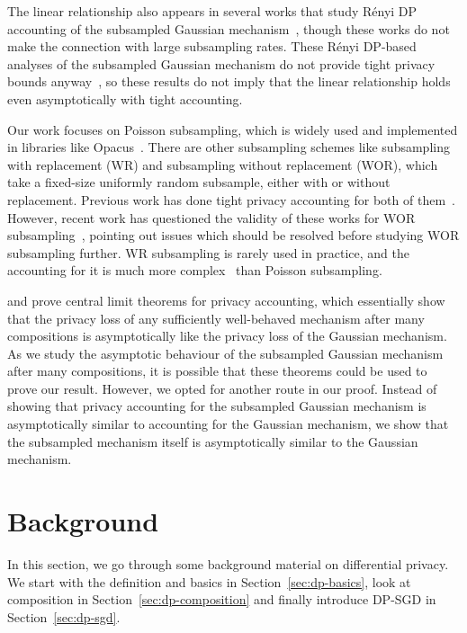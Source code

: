 \documentclass{article}
\theoremstyle{plain}
\theoremstyle{definition}
\theoremstyle{remark}
\begin{document}
The linear relationship also appears in several works that study 
Rényi DP~\citep{mironovRenyiDifferentialPrivacy2017}
accounting of the subsampled Gaussian mechanism~\citep{
abadiDeepLearningDifferential2016,
bunComposableVersatilePrivacy2018,
mironovRenyiDifferentialPrivacy2019}, though these works do not make the connection with large 
subsampling rates. These Rényi DP-based analyses of 
the subsampled Gaussian mechanism do not provide tight 
privacy bounds anyway~\citep{zhuOptimalAccountingDifferential2022}, 
so these results do not imply that the linear relationship holds 
even asymptotically with tight accounting.

Our work focuses on Poisson subsampling, which is widely used and implemented 
in libraries like Opacus~\citep{yousefpourOpacusUserFriendlyDifferential2021a}.
There are other subsampling schemes like subsampling with replacement (WR) and 
subsampling without replacement (WOR), which take a fixed-size uniformly random subsample,
either with or without replacement.
Previous work has done tight privacy accounting for both of 
them~\citep{KoskelaJH20,zhuOptimalAccountingDifferential2022}. However, recent work 
has questioned the validity of these works for WOR 
subsampling~\citep{lebedaAvoidingPitfallsPrivacy2023}, pointing out issues which should 
be resolved before studying WOR subsampling further. WR subsampling is rarely used in practice,
and the accounting for it is much more complex~\citep{KoskelaJH20} than Poisson subsampling.

\citet{sommerPrivacyLossClasses2019} and \citet{DongRS22} prove central limit theorems
for privacy accounting, which essentially show that
the privacy loss of any sufficiently well-behaved mechanism after many compositions is asymptotically 
like the privacy 
loss of the Gaussian mechanism. As we study the asymptotic behaviour of the subsampled Gaussian 
mechanism after many 
compositions, it is possible that these theorems could be used to prove our result. 
However, we opted for another route in our proof. Instead of showing that privacy accounting 
for the subsampled Gaussian mechanism is asymptotically similar to accounting for the 
Gaussian mechanism, we show that the subsampled mechanism itself is asymptotically similar to 
the Gaussian mechanism.

\section{Background}\label{sec:background}
In this section, we go through some background material on differential privacy.
We start with the definition and basics in Section~\ref{sec:dp-basics},
look at composition in Section~\ref{sec:dp-composition} and finally 
introduce DP-SGD in Section~\ref{sec:dp-sgd}.
\end{document}
